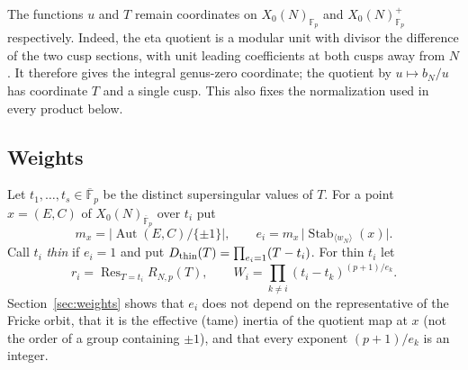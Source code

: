 \documentclass[11pt,a4paper]{article}
\numberwithin{equation}{section}
\theoremstyle{definition}
\theoremstyle{remark}
\newcommand{\Fp}{\mathbb F_p}
\newcommand{\Fb}{\overline{\mathbb F}_p}
\newcommand{\Res}{\operatorname{Res}}
\newcommand{\Aut}{\operatorname{Aut}}
\newcommand{\Stab}{\operatorname{Stab}}
\begin{document}
The functions $u$ and $T$ remain coordinates on $X_0(N)_{\Fp}$ and
$X_0(N)^+_{\Fp}$ respectively. Indeed, the eta quotient is a modular unit with
divisor the difference of the two cusp sections, with unit leading coefficients
at both cusps away from $N$. It therefore gives the integral genus-zero coordinate;
the quotient by $u\mapsto b_N/u$ has coordinate $T$ and a single cusp.
This also fixes the normalization used in every product below.
\subsection{Weights}
Let $t_1,\dots,t_s\in\Fb$ be the distinct supersingular values of $T$. For a point
$x=(E,C)$ of $X_0(N)_{\Fb}$ over $t_i$ put
\[
m_x=\bigl|\Aut(E,C)/\{\pm1\}\bigr|,\qquad e_i=m_x\,\bigl|\Stab_{\langle w_N\rangle}(x)\bigr|.
\]
Call $t_i$ \emph{thin} if $e_i=1$ and put $D_{\rm thin}(T)=\prod_{e_i=1}(T-t_i)$. For thin $t_i$ let
\[
r_i=\Res_{T=t_i}R_{N,p}(T),\qquad W_i=\prod_{k\ne i}(t_i-t_k)^{(p+1)/e_k}.
\]
Section~\ref{sec:weights} shows that $e_i$ does not depend on the representative of the Fricke
orbit, that it is the effective (tame) inertia of the quotient map at $x$ (not the order of a group
containing $\pm1$), and that every exponent $(p+1)/e_k$ is an integer.
\end{document}

